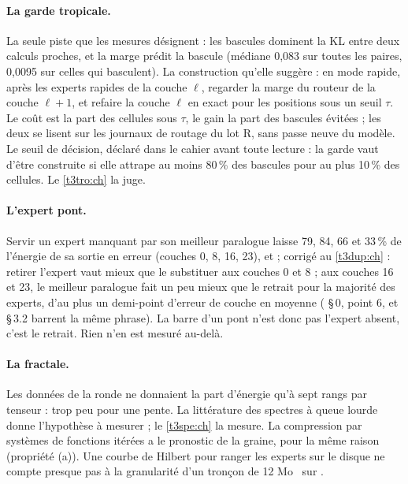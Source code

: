 \paragraph{La garde tropicale.} La seule piste que les mesures désignent : les bascules dominent la KL entre deux calculs proches, et la marge prédit la bascule (médiane 0,083 sur toutes les paires, 0,0095 sur celles qui basculent). La construction qu'elle suggère : en mode rapide, après les experts rapides de la couche $\ell$, regarder la marge du routeur de la couche $\ell + 1$, et refaire la couche $\ell$ en exact pour les positions sous un seuil $\tau$. Le coût est la part des cellules sous $\tau$, le gain la part des bascules évitées ; les deux se lisent sur les journaux de routage du lot R, sans passe neuve du modèle. Le seuil de décision, déclaré dans le cahier avant toute lecture : la garde vaut d'être construite si elle attrape au moins 80\,\% des bascules pour au plus 10\,\% des cellules. Le \cref{t3tro:ch} la juge.

\paragraph{L'expert pont.} Servir un expert manquant par son meilleur paralogue laisse 79, 84, 66 et 33\,\% de l'énergie de sa sortie en erreur (couches 0, 8, 16, 23), et  ; corrigé au \cref{t3dup:ch} : retirer l'expert vaut mieux que le substituer aux couches 0 et 8 ; aux couches 16 et 23, le meilleur paralogue fait un peu mieux que le retrait pour la majorité des experts, d'au plus un demi-point d'erreur de couche en moyenne ( §\,0, point 6, et  §\,3.2 barrent la même phrase). La barre d'un pont n'est donc pas l'expert absent, c'est le retrait. Rien n'en est mesuré au-delà.

\paragraph{La fractale.} Les données de la ronde ne donnaient la part d'énergie qu'à sept rangs par tenseur : trop peu pour une pente. La littérature des spectres à queue lourde \parencite{martin2018implicit} donne l'hypothèse à mesurer \litt ; le \cref{t3spe:ch} la mesure. La compression par systèmes de fonctions itérées a le pronostic de la graine, pour la même raison (propriété (a)). Une courbe de Hilbert pour ranger les experts sur le disque ne compte presque pas à la granularité d'un tronçon de 12 Mo \calc~sur \mes.

